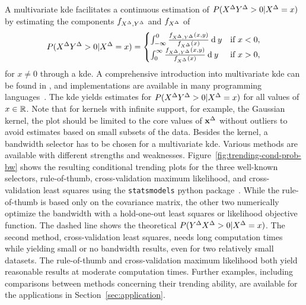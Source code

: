A multivariate \acf{kde} facilitates a continuous estimation of $P(X^{\Delta} Y^{\Delta} > 0 | X^{\Delta} = x)$ by estimating the components $f_{X^{\Delta}, Y^{\Delta}}$ and $f_{X^{\Delta}}$ of
\begin{align*}
P(X^{\Delta} Y^{\Delta} > 0 | X^{\Delta} = x) = \begin{cases}
                                              \int_{-\infty}^0 \frac{f_{X^{\Delta}, Y^{\Delta}}(x, y)}{f_{X^{\Delta}}(x)} \: \textrm{d} \: y & \text{if } x < 0, \\
                                              \int_{0}^{\infty} \frac{f_{X^{\Delta}, Y^{\Delta}}(x, y)}{f_{X^{\Delta}}(x)} \: \textrm{d} \: y & \text{if } x > 0, \\
\end{cases}
\end{align*}
for $x \neq 0$ through a \ac{kde}.
A comprehensive introduction into multivariate \ac{kde} can be found in \textcite{Gramacki2018}, and implementations are available in many programming languages~\parencite[e.g., for  Python in][]{Seabold2010}.
The \ac{kde} yields estimates for $P(X^{\Delta} Y^{\Delta} > 0 | X^{\Delta} = x)$ for all values of $x \in \mathbb{R}$.
Note that for kernels with infinite support, for example, the Gaussian kernel, the plot should be limited to the core values of $\mathbf{x}^{\Delta}$ without outliers to avoid estimates based on small subsets of the data.
Besides the kernel, a bandwidth selector has to be chosen for a multivariate \ac{kde}.
Various methods are available with different strengths and weaknesses.
Figure~\ref{fig:trending-cond-prob-bw} shows the resulting conditional trending plots for the three well-known selectors, rule-of-thumb, cross-validation maximum likelihood, and cross-validation least squares using the \verb|statsmodels| python package~\parencite{Seabold2010}.
While the rule-of-thumb is based only on the covariance matrix, the other two numerically optimize the bandwidth with a hold-one-out least squares or likelihood objective function.
The dashed line shows the theoretical $P(Y^{\Delta} X^{\Delta} > 0 | X^{\Delta} = x)$.
The second method, cross-validation least squares, needs long computation times while yielding small or no bandwidth results, even for two relatively small datasets.
The rule-of-thumb and cross-validation maximum likelihood both yield reasonable results at moderate computation times. 
Further examples, including comparisons between methods concerning their trending ability, are available for the applications in Section~\ref{sec:application}.

